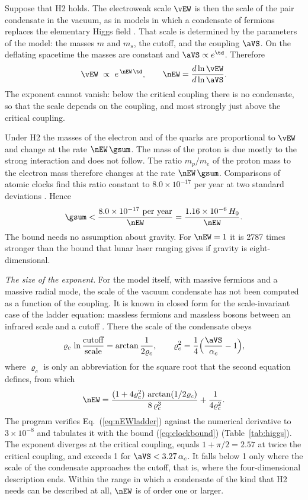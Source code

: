 Suppose that H2 holds. The electroweak scale $\vEW$ is then the scale of the pair condensate in the
vacuum, as in models in which a condensate of fermions replaces the elementary Higgs field
\cite{BardeenHillLindner1990}. That scale is determined by the parameters of the model: the masses
$m$ and $m_s$, the cutoff, and the coupling $\aVS$. On the deflating spacetime the masses are constant
and $\aVS\propto e^{\td}$. Therefore
\begin{equation}
\vEW\ \propto\ e^{\,\nEW\,\td},\qquad\nEW=\frac{d\ln\vEW}{d\ln\aVS}.
\label{eq:nEW}
\end{equation}
The exponent cannot vanish: below the critical coupling there is no condensate, so that the scale
depends on the coupling, and most strongly just above the critical coupling.

Under H2 the masses of the electron and of the quarks are proportional to $\vEW$ and change at the
rate $\nEW\,\gsum$. The mass of the proton is due mostly to the strong interaction and does not
follow. The ratio $m_p/m_e$ of the proton mass to the electron mass therefore changes at the rate
$\nEW\,\gsum$. Comparisons of atomic clocks find this ratio constant to $8.0\times10^{-17}$ per year
at two standard deviations \cite{Lange2021}. Hence
\begin{equation}
\gsum<\frac{8.0\times10^{-17}\ \text{per year}}{\nEW}=\frac{1.16\times10^{-6}\,H_0}{\nEW}.
\label{eq:clockbound}
\end{equation}
The bound needs no assumption about gravity. For $\nEW=1$ it is 2787 times stronger than the bound
that lunar laser ranging gives if gravity is eight-dimensional.

\emph{The size of the exponent.} For the model itself, with massive fermions and a massive radial
mode, the scale of the vacuum condensate has not been computed as a function of the coupling. It is
known in closed form for the scale-invariant case of the ladder equation: massless
fermions and massless bosons between an infrared scale and a cutoff \cite{Miransky1985}. There the
scale of the condensate obeys
\begin{equation}
\varrho_c\,\ln\frac{\text{cutoff}}{\text{scale}}=\arctan\frac{1}{2\varrho_c},\qquad
\varrho_c^{2}=\frac14\Big(\frac{\aVS}{\alpha_c}-1\Big),
\end{equation}
where $\varrho_c$ is only an abbreviation for the square root that the second equation defines, from
which
\begin{equation}
\nEW=\frac{(1+4\varrho_c^{2})\,\arctan(1/2\varrho_c)}{8\,\varrho_c^{3}}+\frac{1}{4\varrho_c^{2}}.
\label{eq:nEWladder}
\end{equation}
The program verifies Eq.~(\ref{eq:nEWladder}) against the numerical derivative to $3\times10^{-8}$
and tabulates it with the bound (\ref{eq:clockbound}) (Table~\ref{tab:higgs}). The exponent diverges
at the critical coupling, equals $1+\pi/2=2.57$ at twice the critical coupling, and exceeds 1 for
$\aVS<3.27\,\alpha_c$. It falls below 1 only where the scale of the condensate approaches the cutoff,
that is, where the four-dimensional description ends. Within the range in which a condensate of the
kind that H2 needs can be described at all, $\nEW$ is of order one or larger.

